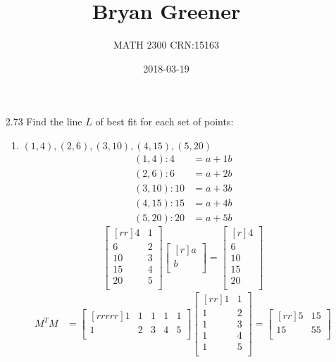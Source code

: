 \documentclass[12pt]{article}
\title{Bryan Greener}
\author{MATH 2300 CRN:15163}
\date{2018-03-19}
\theoremstyle{definition}
\theoremstyle{plain}
\begin{document}
\maketitle

\TabPositions{4cm}

\begin{enumerate}
\item[2.73]Find the line $L$ of best fit for each set of points:
	\begin{enumerate}
	\item $(1,4),(2,6),(3,10),(4,15),(5,20)$
		\begin{align*}
		(1,4): 4&=a+1b\\
		(2,6): 6&=a+2b\\
		(3,10): 10&=a+3b\\
		(4,15): 15&=a+4b\\
		(5,20): 20&=a+5b
		\end{align*}
		\[ \begin{bmatrix}[rr]4&1\\6&2\\10&3\\15&4\\20&5\\\end{bmatrix}\begin{bmatrix}[r]a\\b\\\end{bmatrix}=\begin{bmatrix}[r]4\\6\\10\\15\\20\\\end{bmatrix} \]
		\begin{align*}
		M^TM&=\begin{bmatrix}[rrrrr]1&1&1&1&1\\1&2&3&4&5\\\end{bmatrix}\begin{bmatrix}[rr]1&1\\1&2\\1&3\\1&4\\1&5\\\end{bmatrix} = \begin{bmatrix}[rr]5&15\\15&55\\\end{bmatrix}\\

\end{align*}
\end{enumerate}
\end{enumerate}
\end{document}
